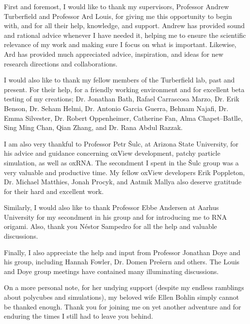 

First and foremost, I would like to thank my supervisors, Professor Andrew Turberfield and Professor Ard Louis, for giving me this opportunity to begin with, and for all their help, knowledge, and support. Andrew has provided sound and rational advice whenever I have needed it, helping me to ensure the scientific relevance of my work and making sure I focus on what is important. Likewise, Ard has provided much appreciated advice, inspiration, and ideas for new research directions and collaborations.

I would also like to thank my fellow members of the Turberfield lab, past and present. For their help, for a friendly working environment and for excellent beta testing of my creations; Dr. Jonathan Bath, Rafael Carrascosa Marzo, Dr. Erik Benson, Dr. Seham Helmi, Dr. Antonio Garcia Guerra, Behnam Najafi, Dr. Emma Silvester, Dr. Robert Oppenheimer, Catherine Fan, Alma Chapet--Batlle, Sing Ming Chan, Qian Zhang, and Dr. Rana Abdul Razzak.

I am also very thankful to Professor Petr {\v{S}}ulc, at Arizona State University, for his advice and guidance concerning oxView development, patchy particle simulation, as well as oxRNA. The secondment I spent in the {\v{S}}ulc group was a very valuable and productive time. My fellow oxView developers Erik Poppleton, Dr. Michael Matthies, Jonah Procyk, and Aatmik Mallya also deserve gratitude for their hard and excellent work.

Similarly, I would also like to thank Professor Ebbe Andersen at Aarhus University for my secondment in his group and for introducing me to RNA origami. Also, thank you Néstor Sampedro for all the help and valuable discussions.

Finally, I also appreciate the help and input from Professor Jonathan Doye and his group, including Hannah Fowler, Dr. Domen Prešern and others. The Louis and Doye group meetings have contained many illuminating discussions.

On a more personal note, for her undying support (despite my endless ramblings about polycubes and simulations), my beloved wife Ellen Bohlin simply cannot be thanked enough. Thank you for joining me on yet another adventure and for enduring the times I still had to leave you behind. 

